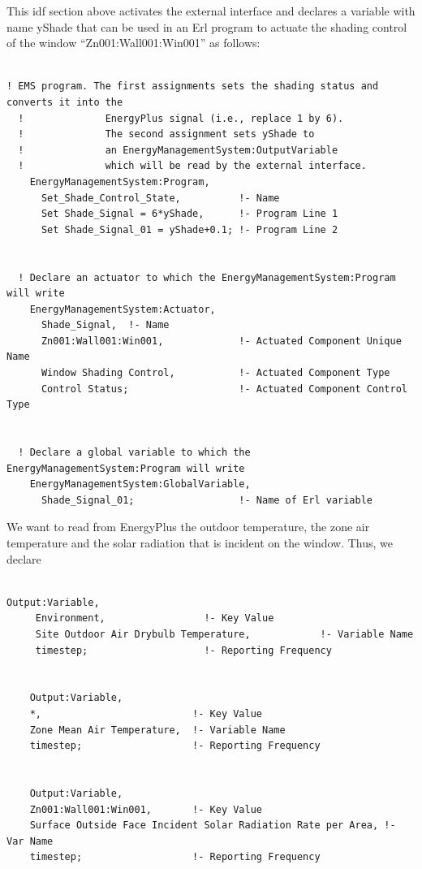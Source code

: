 This idf section above activates the external interface and declares a variable with name yShade that can be used in an Erl program to actuate the shading control of the window ``Zn001:Wall001:Win001'' as follows:

\begin{lstlisting}

! EMS program. The first assignments sets the shading status and converts it into the
  !              EnergyPlus signal (i.e., replace 1 by 6).
  !              The second assignment sets yShade to
  !              an EnergyManagementSystem:OutputVariable
  !              which will be read by the external interface.
    EnergyManagementSystem:Program,
      Set_Shade_Control_State,          !- Name
      Set Shade_Signal = 6*yShade,      !- Program Line 1
      Set Shade_Signal_01 = yShade+0.1; !- Program Line 2


  ! Declare an actuator to which the EnergyManagementSystem:Program will write
    EnergyManagementSystem:Actuator,
      Shade_Signal,  !- Name
      Zn001:Wall001:Win001,             !- Actuated Component Unique Name
      Window Shading Control,           !- Actuated Component Type
      Control Status;                   !- Actuated Component Control Type


  ! Declare a global variable to which the EnergyManagementSystem:Program will write
    EnergyManagementSystem:GlobalVariable,
      Shade_Signal_01;                  !- Name of Erl variable
\end{lstlisting}

We want to read from EnergyPlus the outdoor temperature, the zone air temperature and the solar radiation that is incident on the window. Thus, we declare

\begin{lstlisting}

Output:Variable,
     Environment,                 !- Key Value
     Site Outdoor Air Drybulb Temperature,            !- Variable Name
     timestep;                    !- Reporting Frequency


    Output:Variable,
    *,                          !- Key Value
    Zone Mean Air Temperature,  !- Variable Name
    timestep;                   !- Reporting Frequency


    Output:Variable,
    Zn001:Wall001:Win001,       !- Key Value
    Surface Outside Face Incident Solar Radiation Rate per Area, !- Var Name
    timestep;                   !- Reporting Frequency
\end{lstlisting}

